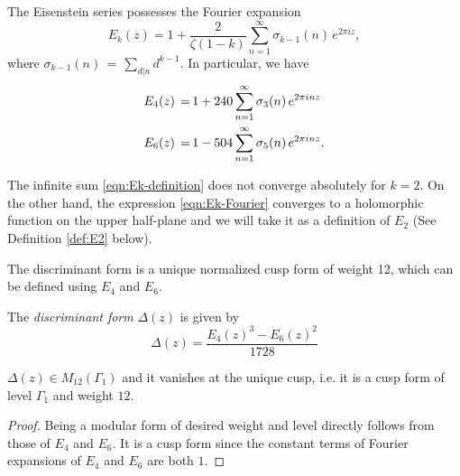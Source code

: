 \begin{lemma}\label{lemma:Ek-Fourier}
The Eisenstein series possesses the Fourier expansion
\begin{equation}\label{eqn:Ek-Fourier}E_k(z)=1+\frac{2}{\zeta(1-k)}\sum_{n=1}^\infty \sigma_{k-1}(n)\,e^{2\pi i z}, \end{equation}
where $\sigma_{k-1}(n)\,=\,\sum_{d|n} d^{k-1}$. In particular, we have
\begin{align}
  E_4(z)\,=\,& 1+240\sum_{n=1}^\infty \sigma_3(n)\,e^{2\pi i n z} \notag \\
  E_6(z)\,=\,& 1-504\sum_{n=1}^\infty \sigma_5(n)\,e^{2\pi i n z}. \notag
\end{align}
\end{lemma}
The infinite sum \eqref{eqn:Ek-definition} does not converge absolutely for $k=2$.
On the other hand, the expression \eqref{eqn:Ek-Fourier} converges to a holomorphic function on the upper half-plane and we will take it as a definition of $E_2$ (See Definition \ref{def:E2} below).


The discriminant form is a unique normalized cusp form of weight 12, which can be defined using $E_4$ and $E_6$.
\begin{definition}\label{def:disc-definition}%
The \emph{discriminant form} $\Delta(z)$ is given by
\begin{equation}\label{eqn:disc-definition}
\Delta(z) = \frac{E_4(z)^3 - E_6(z)^2}{1728}
\end{equation}
\end{definition}

\begin{lemma}\label{lemma:disc-cuspform}
$\Delta(z) \in M_{12}(\Gamma_1)$ and it vanishes at the unique cusp, i.e. it is a cusp form of level $\Gamma_1$ and weight $12$.
\end{lemma}
\begin{proof}
Being a modular form of desired weight and level directly follows from those of $E_4$ and $E_6$.
It is a cusp form since the constant terms of Fourier expansions of $E_4$ and $E_6$ are both $1$.
\end{proof}

